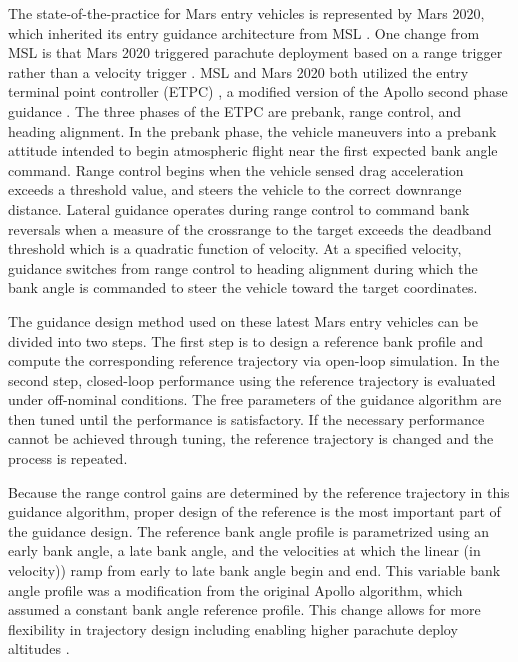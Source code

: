 \documentclass[journal ]{new-aiaa}
\begin{document}
The state-of-the-practice for Mars entry vehicles is represented by Mars 2020, which inherited its entry guidance architecture from MSL \cite{M2020_EDL}. One change from MSL is that Mars 2020 triggered parachute deployment based on a range trigger rather than a velocity trigger \cite{TriggerComparison2020}. 
MSL and Mars 2020 both utilized the entry terminal point controller (ETPC) \cite{MSL_EDL, M2020_EDL}, a modified version of the Apollo second phase guidance \cite{MSL_EDL2}.
The three phases of the ETPC are prebank, range control, and heading alignment. In the prebank phase, the vehicle maneuvers into a prebank attitude intended to begin atmospheric flight near the first expected bank angle command.
Range control begins when the vehicle sensed drag acceleration exceeds a threshold value, and steers the vehicle to the correct downrange distance. Lateral guidance operates during range control to command bank reversals when a measure of the crossrange to the target exceeds the deadband threshold which is a quadratic function of velocity. At a specified velocity, guidance switches from range control to heading alignment during which the bank angle is commanded to steer the vehicle toward the target coordinates.

The guidance design method used on these latest Mars entry vehicles \cite{MSL_EDL2,M2020_EDL} can be divided into two steps. The first step is to design a reference bank profile and compute the corresponding reference trajectory via open-loop simulation. In the second step, closed-loop performance using the reference trajectory is evaluated under off-nominal conditions. The free parameters of the guidance algorithm are then tuned until the performance is satisfactory. If the necessary performance cannot be achieved through tuning, the reference trajectory is changed and the process is repeated. 

Because the range control gains are determined by the reference trajectory in this guidance algorithm, proper design of the reference is the most important part of the guidance design. The reference bank angle profile is parametrized using an early bank angle, a late bank angle, and the velocities at which the linear (in velocity)) ramp from early to late bank angle begin and end. This variable bank angle profile was a modification from the original Apollo algorithm, which assumed a constant bank angle reference profile. This change allows for more flexibility in trajectory design including enabling higher parachute deploy altitudes \cite{MSL_EDL2}.
\end{document}
